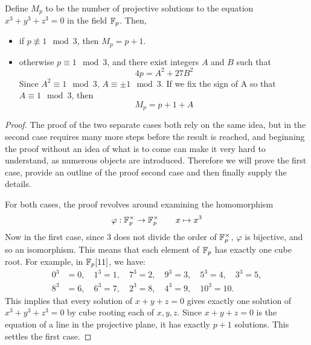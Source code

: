 
\begin{theorem}
Define $M_p$ to be the number of projective solutions to the equation $x^3 + y^3 + z^3 = 0$ in the field $\mathbb{F}_p$. Then,
\begin{itemize}
\item if $p \not\equiv 1 \mod{3}$, then $M_p = p + 1$.
\item otherwise $p \equiv 1 \mod{3}$, and there exist integers $A$ and $B$ such that
	$$4p = A^2 + 27B^2$$
	Since $A^2 \equiv 1 \mod{3}$, $A \equiv \pm1 \mod{3}$. If we fix the sign of A so that $A \equiv 1 \mod{3}$, then
	$$M_p = p + 1 + A$$
\end{itemize}
\end{theorem}

\begin{proof}
The proof of the two separate cases both rely on the same idea, but in the second case requires many more steps before the result is reached, and beginning the proof without an idea of what is to come can make it very hard to understand, as numerous objects are introduced. Therefore we will prove the first case, provide an outline of the proof second case and then finally supply the details.

For both cases, the proof revolves around examining the homomorphism
$$\varphi: \mathbb{F}_p^{\times} \rightarrow \mathbb{F}_p^{\times} \qquad x \mapsto x^3$$
Now in the first case, since 3 does not divide the order of $\mathbb{F}_p^{\times}$, $\varphi$ is bijective, and so an isomorphism. This means that each element of $\mathbb{F}_p$ has exactly one cube root. For example, in $\mathbb{F}_p[11]$, we have:
\begin{align*}
	0^3 &= 0,\quad
	1^3 = 1,\quad
	7^3 = 2,\quad
	9^3 = 3,\quad
	5^3 = 4,\quad
	3^3 = 5,\\
	8^3 &= 6,\quad
	6^3 = 7,\quad
	2^3 = 8,\quad
	4^3 = 9,\quad
	10^3 = 10.
\end{align*}
This implies that every solution of $x + y + z = 0$ gives exactly one solution of $x^3 + y^3 + z^3 = 0$ by cube rooting each of $x,y,z$. Since $x + y + z = 0$ is the equation of a line in the projective plane, it has exactly $p+1$ solutions. This settles the first case.
\end{proof}

